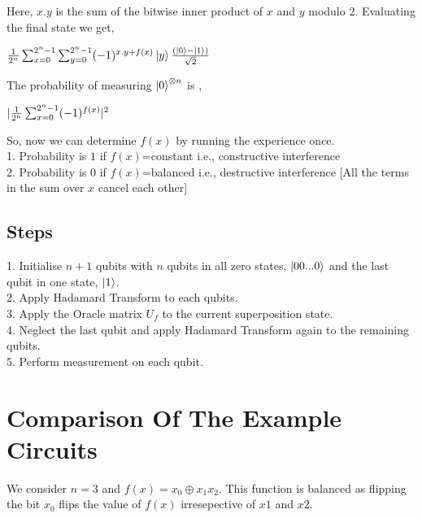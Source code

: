 \documentclass{article}
\begin{document}
Here, $x.y$ is the sum of the bitwise inner product of $x$ and $y$ modulo $2$. Evaluating the final state we get, 
\begin{center}
${1\over {2^n}}\sum_{x=0}^{2^n-1} \sum_{y=0}^{2^n-1} (-1)^{x.y+f(x)}\ket{y}{(\ket{0}-\ket{1})\over \sqrt{2}}$
\end{center}
The probability of measuring $\ket{0}^{\otimes n}$ is ,
\begin{center}
$|{1\over {2^n}}\sum_{x=0}^{2^n-1} (-1)^{f(x)}|^2$
\end{center}
So, now we can determine $f(x)$ by running the experience once.\\  
1. Probability is $1$ if $f(x)$=constant i.e., constructive interference\\ 
2. Probability is $0$ if $f(x)$=balanced i.e., destructive interference  [All the terms in the sum over $x$ cancel each other]
\subsection{Steps}
1. Initialise $n+1$ qubits with $n$ qubits in all zero states, $\ket{00...0}$ and the last qubit in one state, $\ket{1}$.\\ 
2. Apply Hadamard Transform to each qubits.\\ 
3. Apply the Oracle matrix $U_f$ to the current superposition state.\\ 
4. Neglect the last qubit and apply Hadamard Transform again to the remaining qubits.\\ 
5. Perform measurement on each qubit.\\ 

\section{Comparison Of The Example Circuits}
We consider $n=3$ and $f(x)=x_0 \oplus x_1x_2$. This function is balanced as flipping the bit $x_0$ flips the value of $f(x)$ irresepective of $x1$ and $x2$.
\end{document}

